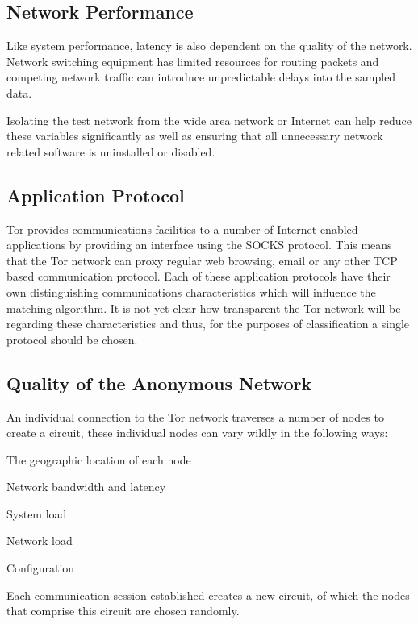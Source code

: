 \documentclass{ecuthesis}
\begin{document}
\subsection{Network Performance}

Like system performance, latency is also dependent on the quality of the network. Network switching equipment has limited resources for routing packets and competing network traffic can introduce unpredictable delays into the sampled data. 

Isolating the test network from the wide area network or Internet can help reduce these variables significantly as well as ensuring that all unnecessary network related software is uninstalled or disabled.

\subsection{Application Protocol}

Tor provides communications facilities to a number of Internet enabled applications by providing an interface using the SOCKS protocol. This means that the Tor network can proxy regular web browsing, email or any other TCP based communication protocol. Each of these application protocols have their own distinguishing communications characteristics which will influence the matching algorithm. It is not yet clear how transparent the Tor network will be regarding these characteristics and thus, for the purposes of classification a single protocol should be chosen.

\subsection{Quality of the Anonymous Network}

An individual connection to the Tor network traverses a number of nodes to create a circuit, these individual nodes can vary wildly in the following ways:

\begin{itemize*}
\item The geographic location of each node
\item Network bandwidth and latency
\item System load
\item Network load
\item Configuration
\end{itemize*}

Each communication session established creates a new circuit, of which the nodes that comprise this circuit are chosen randomly.
\end{document}
